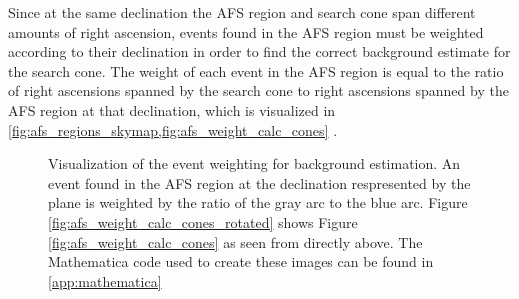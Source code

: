 Since at the same declination the AFS region and search cone span different amounts of right ascension, events found in the AFS region must be weighted according to their declination in order to find the correct background estimate for the search cone.  The weight of each event in the AFS region is equal to the ratio of right ascensions spanned by the search cone to right ascensions spanned by the AFS region at that declination, which is visualized in \cref{fig:afs_regions_skymap,fig:afs_weight_calc_cones} .  
\begin{figure} 
       \centering
\caption{Visualization of the event weighting for background estimation.  An event found in the AFS region at the declination respresented by the plane is weighted by the ratio of the gray arc to the blue arc.  Figure \ref{fig:afs_weight_calc_cones_rotated} shows Figure \ref{fig:afs_weight_calc_cones} as seen from directly above.  The Mathematica code used to create these images can be found in \cref{app:mathematica}} 
\end{figure}
